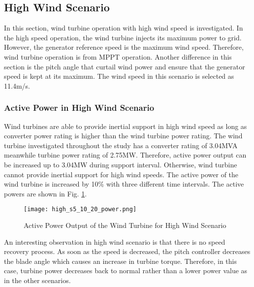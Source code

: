 \subsection{High Wind Scenario}
In this section, wind turbine operation with high wind speed is investigated. In the high speed operation, the wind turbine injects its maximum power to grid. However, the generator reference speed is the maximum wind speed. Therefore, wind turbine operation is from MPPT operation. Another difference in this section is the pitch angle that curtail wind power and ensure that the generator speed is kept at its maximum. The wind speed in this scenario is selected as 11.4m/s.\par
\subsubsection{Active Power in High Wind Scenario}
Wind turbines are able to provide inertial support in high wind speed as long as converter power rating is higher than the wind turbine power rating. The wind turbine investigated throughout the study has a converter rating of 3.04MVA meanwhile turbine power rating of 2.75MW. Therefore, active power output can be increased up to 3.04MW during support interval. Otherwise, wind turbine cannot provide inertial support for high wind speeds. The active power of the wind turbine is increased by 10\% with three different time intervals. The active powers are shown in Fig. \ref{high_powers}.\par
\begin{figure}[h!]
	\centering
	\texttt{[image: high\_s5\_10\_20\_power.png]}
	\caption{Active Power Output of the Wind Turbine for High Wind Scenario}
	\label{high_powers}
\end{figure}
An interesting observation in high wind scenario is that there is no speed recovery process. As soon as the speed is decreased, the pitch controller decreases the blade angle which causes an increase in turbine torque. Therefore, in this case, turbine power decreases back to normal rather than a lower power value as in the other scenarios.
